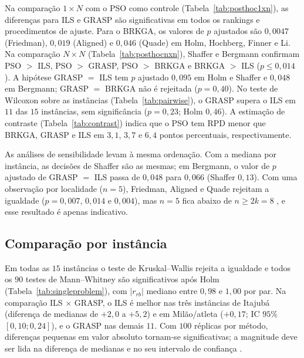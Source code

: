 Na comparação $1\times N$ com o PSO como controle (Tabela~\ref{tab:posthoc1xn}), as diferenças para
ILS e GRASP são significativas em todos os rankings e procedimentos de ajuste. Para o BRKGA, os valores
de $p$ ajustados são $0{,}0047$ (Friedman), $0{,}019$ (Aligned) e $0{,}046$ (Quade) em Holm, Hochberg,
Finner e Li. Na comparação $N\times N$ (Tabela~\ref{tab:posthocnxn}), Shaffer e Bergmann confirmam
PSO $>$ ILS, PSO $>$ GRASP, PSO $>$ BRKGA e BRKGA $>$ ILS ($p\leq0{,}014$). A hipótese GRASP $=$ ILS
tem $p$ ajustado $0{,}095$ em Holm e Shaffer e $0{,}048$ em Bergmann; GRASP $=$ BRKGA não é rejeitada
($p=0{,}40$). No teste de Wilcoxon sobre as instâncias (Tabela~\ref{tab:pairwise}), o GRASP supera o
ILS em $11$ das $15$ instâncias, sem significância ($p=0{,}23$; Holm $0{,}46$). A estimação de
contraste (Tabela~\ref{tab:contrast}) indica que o PSO tem RPD menor que BRKGA, GRASP e ILS em
$3{,}1$, $3{,}7$ e $6{,}4$ pontos percentuais, respectivamente.






As análises de sensibilidade levam à mesma ordenação. Com a mediana por instância, as decisões de
Shaffer são as mesmas; em Bergmann, o valor de $p$ ajustado de GRASP $=$ ILS passa de $0{,}048$ para
$0{,}066$ (Shaffer $0{,}13$). Com uma observação por
localidade ($n=5$), Friedman, Aligned e Quade rejeitam a igualdade ($p=0{,}007$, $0{,}014$ e $0{,}004$),
mas $n=5$ fica abaixo de $n\geq2k=8$ \cite[Sec.~6.1]{derrac2011practical}, e esse resultado é apenas
indicativo.

\subsection{Comparação por instância}

Em todas as $15$ instâncias o teste de Kruskal--Wallis rejeita a igualdade e todos os $90$ testes de
Mann--Whitney são significativos após Holm (Tabela~\ref{tab:singleproblem}), com $|r_{rb}|$ mediano entre
$0{,}98$ e $1{,}00$ por par. Na comparação ILS $\times$ GRASP, o ILS é melhor nas três instâncias de
Itajubá (diferença de medianas de $+2{,}0$ a $+5{,}2$) e em Milão/atleta ($+0{,}17$; IC $95\%$
$[0{,}10; 0{,}24]$), e o GRASP nas demais $11$. Com $100$ réplicas por método, diferenças pequenas em
valor absoluto tornam-se significativas; a magnitude deve ser lida na diferença de medianas e no seu
intervalo de confiança \cite[Secs.~1.4 e 2.5.6]{bartzbeielstein2010experimental}.

